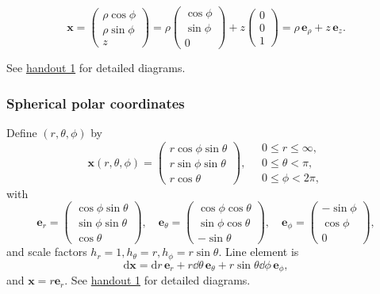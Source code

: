 \begin{note}
    \[
        \mathbf{x}=\begin{pmatrix}
            \rho\cos \phi \\ \rho \sin \phi \\ z
        \end{pmatrix}=\rho\begin{pmatrix}
            \cos \phi \\  \sin \phi \\ 0
        \end{pmatrix}+z \begin{pmatrix}
            0 \\ 0 \\ 1
        \end{pmatrix}=\rho\, \mathbf{e}_\rho+z\, \mathbf{e}_z.
    \]
\end{note}

See \href{http://jt775.user.srcf.net/IA-Lent/handouts/vc_handout1.pdf}{handout 1} for detailed diagrams.

\subsubsection*{Spherical polar coordinates}
Define $ (r,\theta,\phi) $ by 
\[
    \mathbf{x}(r,\theta,\phi) = \begin{pmatrix}
        r \cos \phi \sin \theta \\ r \sin \phi \sin \theta \\ r \cos \theta 
    \end{pmatrix},\quad \begin{matrix}
        0\le r\le \infty, \\ 0\le \theta<\pi,\\ 0 \le \phi< 2\pi,
    \end{matrix}
\]
with 
\[
    \mathbf{e}_r = \begin{pmatrix}
        \cos \phi \sin \theta \\ \sin \phi \sin \theta\\ \cos \theta 
    \end{pmatrix},\quad \mathbf{e}_\theta = \begin{pmatrix}
        \cos \phi \cos \theta \\ \sin \phi \cos \theta \\ -\sin \theta 
    \end{pmatrix},\quad \mathbf{e}_\phi = \begin{pmatrix}
        - \sin \phi \\ \cos \phi \\ 0
    \end{pmatrix},
\]
and scale factors $ h_r=1,h_\theta=r,h_\phi=r \sin \theta $. Line element is 
\[
    \mathrm{d} \mathbf{x} = \mathrm{d} r\,\mathbf{e}_r+ r\dd \theta\,\mathbf{e}_\theta+r \sin \theta\dd \phi\,\mathbf{e}_\phi,
\]
and $ \mathbf{x}=r\mathbf{e}_r $. See \href{http://jt775.user.srcf.net/IA-Lent/handouts/vc_handout1.pdf}{handout 1} for detailed diagrams.

